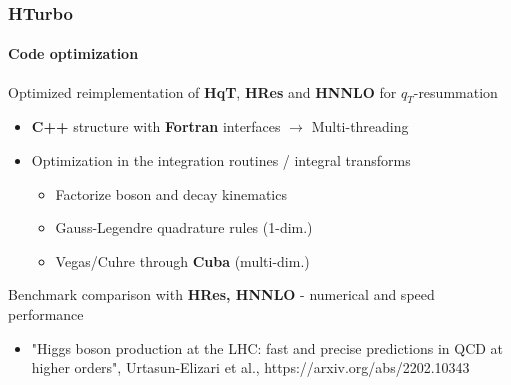 \documentclass[aspectratio=43]{beamer}
\begin{document}
\begin{frame}

	\frametitle{HTurbo}
	\framesubtitle{Code optimization}
	
	\footnotesize
	
	Optimized reimplementation of \textbf{HqT}, \textbf{HRes} and \textbf{HNNLO} for $q_{T}$-resummation
	
	\vspace{0.2 cm}
		
	\begin{itemize}
		\item \textbf{C++} structure with \textbf{Fortran} interfaces $\rightarrow$ Multi-threading
		\item Optimization in the integration routines / integral transforms 
		\begin{itemize}
			\item Factorize boson and decay kinematics
			\item Gauss-Legendre quadrature rules (1-dim.)
			\item Vegas/Cuhre through \textbf{Cuba} (multi-dim.)
		\end{itemize}
	\end{itemize}
	
	\vspace{0.5cm}
	
	Benchmark comparison with \textbf{HRes, HNNLO} - numerical and speed performance \\
	\begin{itemize}
		\item {\color{blue}"Higgs boson production at the LHC:
			fast and precise predictions in QCD at higher orders", Urtasun-Elizari et al., https://arxiv.org/abs/2202.10343}
	\end{itemize}
	
\end{frame}
\end{document}
